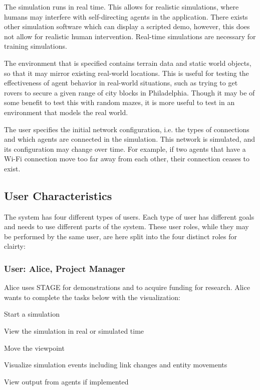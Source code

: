 \documentclass[titlepage]{article}
\begin{document}
The simulation runs in real time.  This allows for realistic simulations, where humans may interfere with self-directing agents in the application. There exists other simulation software which can display a scripted demo, however, this does not allow for realistic human intervention.  Real-time simulations are necessary for training simulations.

The environment that is specified contains terrain data and static world objects, so that it may mirror existing real-world locations.  This is useful for testing the  effectiveness of agent behavior in real-world situations, such as trying to get rovers to secure a given range of city blocks in Philadelphia. Though it may be of some benefit to test this with random mazes, it is more useful to test in an environment that models the real world.

The user specifies the initial network configuration, i.e. the types of connections and which agents are connected in the simulation.  This network is simulated, and its configuration may change over time. For example, if two agents that have a Wi-Fi connection move too far away from each other, their connection ceases to exist. 



\subsection{User Characteristics%
  \label{user-characteristics}%
}

The system has four different types of users.  Each type of user has different goals and needs to use different parts of the system.  These user roles, while they may be performed by the same user, are here split into the four distinct roles for clairty:


\subsubsection{User: Alice, Project Manager%
  \label{alice}%
}

Alice uses STAGE for demonstrations and to acquire funding for research.  Alice wants to complete the tasks below with
the visualization:

\begin{itemize*}
    \item Start a simulation
    \item View the simulation in real or simulated time
    \item Move the viewpoint
    \item Visualize simulation events including link changes and entity movements
    \item View output from agents if implemented
\end{itemize*}
\end{document}
